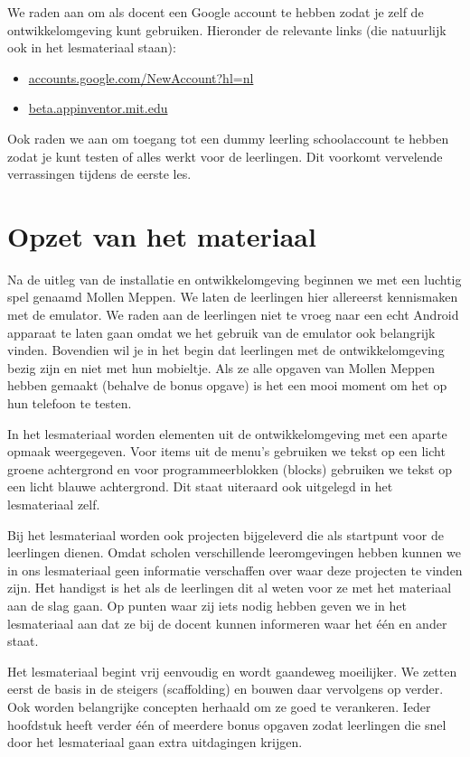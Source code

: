 \documentclass{BYUTextbook}
\begin{document}

We raden aan om als docent een Google account te hebben zodat je zelf de \ai ontwikkelomgeving kunt gebruiken. Hieronder de relevante links (die natuurlijk ook in het lesmateriaal staan):
\begin{itemize}
  \item \url{accounts.google.com/NewAccount?hl=nl}
  \item \url{beta.appinventor.mit.edu}
\end{itemize}
Ook raden we aan om toegang tot een dummy leerling schoolaccount te hebben zodat je kunt testen of alles werkt voor de leerlingen. Dit voorkomt vervelende verrassingen tijdens de eerste les.

\chapter{Opzet van het materiaal}
Na de uitleg van de installatie en ontwikkelomgeving beginnen we met een luchtig spel genaamd Mollen Meppen. We laten de leerlingen hier allereerst kennismaken met de emulator. We raden aan de leerlingen niet te vroeg naar een echt Android apparaat te laten gaan omdat we het gebruik van de emulator ook belangrijk vinden. Bovendien wil je in het begin dat leerlingen met de ontwikkelomgeving bezig zijn en niet met hun mobieltje. Als ze alle opgaven van Mollen Meppen hebben gemaakt (behalve de bonus opgave) is het een mooi moment om het op hun telefoon te testen.

In het lesmateriaal worden elementen uit de ontwikkelomgeving met een aparte opmaak weergegeven. Voor items uit de menu's gebruiken we tekst op een licht groene achtergrond en voor programmeerblokken (blocks) gebruiken we tekst op een licht blauwe achtergrond. Dit staat uiteraard ook uitgelegd in het lesmateriaal zelf.

Bij het lesmateriaal worden ook projecten bijgeleverd die als startpunt voor de leerlingen dienen. Omdat scholen verschillende leeromgevingen hebben kunnen we in ons lesmateriaal geen informatie verschaffen over waar deze projecten te vinden zijn. Het handigst is het als de leerlingen dit al weten voor ze met het materiaal aan de slag gaan. Op punten waar zij iets nodig hebben geven we in het lesmateriaal aan dat ze bij de docent kunnen informeren waar het \'e\'en en ander staat.

Het lesmateriaal begint vrij eenvoudig en wordt gaandeweg moeilijker. We zetten eerst de basis in de steigers (scaffolding) en bouwen daar vervolgens op verder. Ook worden belangrijke concepten herhaald om ze goed te verankeren. Ieder hoofdstuk heeft verder \'e\'en of meerdere bonus opgaven zodat leerlingen die snel door het lesmateriaal gaan extra uitdagingen krijgen.
\end{document}
